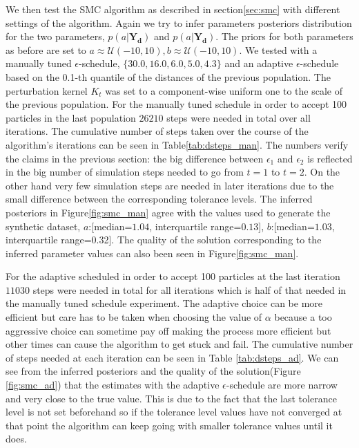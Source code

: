 We then test the SMC algorithm as described in section\ref{sec:smc} with different settings of the algorithm. Again we try to infer parameters posteriors distribution for the two parameters, $p(a|\mathbf{Y_d})$ and $p(a|\mathbf{Y_d})$. The priors for both parameters as before are set to $a \approx \mathcal{U}(-10, 10), b \approx \mathcal{U}(-10, 10)$.  We tested with a manually tuned $\epsilon$-schedule, $\{30.0, 16.0, 6.0, 5.0, 4.3\}$ and an adaptive $\epsilon$-schedule based on the 0.1-th quantile of the distances of the previous population. The perturbation kernel $K_t$ was set to a component-wise uniform one to the scale of the previous population.  For the manually tuned schedule in order to accept 100 particles in the last population $26210$ steps were needed in total over all iterations. The cumulative number of steps taken over the course of the algorithm's iterations can be seen in Table\ref{tab:dsteps_man}. The numbers verify the claims in the previous section: the big difference between $\epsilon_1$ and $\epsilon_2$ is reflected in the big number of simulation steps needed to go from $t=1$ to $t=2$. On the other hand very few simulation steps are needed in later iterations due to the small difference between the corresponding tolerance levels. The inferred posteriors in Figure\ref{fig:smc_man} agree with the values used to generate the synthetic dataset, $a$:[median=$1.04$, interquartile range=$0.13$], $b$:[median=$1.03$, interquartile range=0.32]. The quality of the solution corresponding to the inferred parameter values can also been seen in Figure\ref{fig:smc_man}. 

For the adaptive scheduled in order to accept 100 particles at the last iteration $11030$ steps were needed in total for all iterations which is half of that needed in the manually tuned schedule experiment. The adaptive choice can be more efficient but care has to be taken when choosing the value of $\alpha$ because a too aggressive choice can sometime pay off making the process more efficient but other times can cause the algorithm to get stuck and fail. The cumulative number of steps needed at each iteration can be seen in Table \ref{tab:dsteps_ad}.  We can see from the inferred posteriors and the quality of the solution(Figure \ref{fig:smc_ad}) that the estimates with the adaptive $\epsilon$-schedule are more narrow and very close to the true value. This is due to the fact that the last tolerance level is not set beforehand so if the tolerance level values have not converged at that point the algorithm can keep going with smaller tolerance values until it does. 



